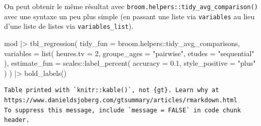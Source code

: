\documentclass[
  letterpaper,
  DIV=11,
  numbers=noendperiod,
  oneside]{scrreprt}
\newenvironment{Shaded}{\begin{snugshade}}{\end{snugshade}}
\newcommand{\AttributeTok}[1]{\textcolor[rgb]{0.40,0.45,0.13}{#1}}
\newcommand{\DecValTok}[1]{\textcolor[rgb]{0.68,0.00,0.00}{#1}}
\newcommand{\FloatTok}[1]{\textcolor[rgb]{0.68,0.00,0.00}{#1}}
\newcommand{\FunctionTok}[1]{\textcolor[rgb]{0.28,0.35,0.67}{#1}}
\newcommand{\NormalTok}[1]{\textcolor[rgb]{0.00,0.23,0.31}{#1}}
\newcommand{\SpecialCharTok}[1]{\textcolor[rgb]{0.37,0.37,0.37}{#1}}
\newcommand{\StringTok}[1]{\textcolor[rgb]{0.13,0.47,0.30}{#1}}
\begin{document}
\begin{tcolorbox}
On peut obtenir le même résultat avec
\texttt{broom.helpers::tidy\_avg\_comparison()} avec une syntaxe un peu
plus simple (en passant une liste via \texttt{variables} au lieu d'une
liste de listes via \texttt{variables\_list}).

\begin{Shaded}
\begin{Highlighting}[]
\NormalTok{mod }\SpecialCharTok{|\textgreater{}} 
  \FunctionTok{tbl\_regression}\NormalTok{(}
    \AttributeTok{tidy\_fun =}\NormalTok{ broom.helpers}\SpecialCharTok{::}\NormalTok{tidy\_avg\_comparisons,}
    \AttributeTok{variables =} \FunctionTok{list}\NormalTok{(}
      \AttributeTok{heures.tv =} \DecValTok{2}\NormalTok{,}
      \AttributeTok{groupe\_ages =} \StringTok{"pairwise"}\NormalTok{,}
      \AttributeTok{etudes =} \StringTok{"sequential"}
\NormalTok{    ),}
    \AttributeTok{estimate\_fun =}\NormalTok{ scales}\SpecialCharTok{::}\FunctionTok{label\_percent}\NormalTok{(}
      \AttributeTok{accuracy =} \FloatTok{0.1}\NormalTok{,}
      \AttributeTok{style\_positive =} \StringTok{"plus"}
\NormalTok{    )}
\NormalTok{  ) }\SpecialCharTok{|\textgreater{}} 
  \FunctionTok{bold\_labels}\NormalTok{()}
\end{Highlighting}
\end{Shaded}

\begin{verbatim}
Table printed with `knitr::kable()`, not {gt}. Learn why at
https://www.danieldsjoberg.com/gtsummary/articles/rmarkdown.html
To suppress this message, include `message = FALSE` in code chunk header.
\end{verbatim}


\end{tcolorbox}
\end{document}
